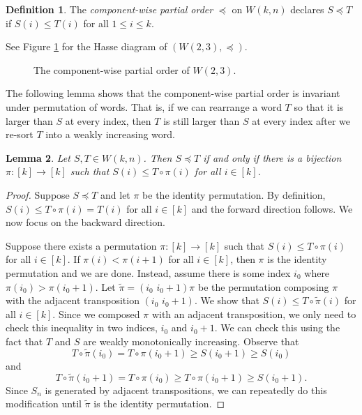 \documentclass{amsart}
\theoremstyle{definition}
\newtheorem{defn}{Definition}[section]
\theoremstyle{plain}
\newtheorem{lemma}[defn]{Lemma}
\begin{document}
\begin{defn}\label{defn:cmpt}
  The \emph{component-wise partial order} $\preceq$ on $W(k,n)$ declares $S\preceq T$ if $S(i)\leq T(i)$ for all $1\leq i \leq k$.
\end{defn}
\noindent See Figure \ref{fig:hasse_words} for the Hasse diagram of $(W(2,3), \preceq)$.


\begin{figure}[ht]
\caption{The component-wise partial order of $W(2,3)$.}
\label{fig:hasse_words}
\end{figure}

The following lemma shows that the component-wise partial order is invariant under permutation of words. That is, if we can rearrange a word $T$ so that it is larger than $S$ at every index, then $T$ is still larger than $S$ at every index after we re-sort $T$ into a weakly increasing word.

\begin{lemma}
  \label{lem:weaker_prec}
Let $S,T\in W(k,n)$. Then $S\preceq T$ if and only if there is a bijection $\pi:[k]\to [k]$ such that $S(i)\leq T\circ \pi (i)$ for all $i\in[k]$.
\end{lemma}
\begin{proof}
  Suppose $S\preceq T$ and let $\pi$ be the identity permutation. By definition, $S(i)\leq T\circ \pi(i)= T(i)$ for all $i\in[k]$ and the forward direction follows. We now focus on the backward direction.

  Suppose there exists a permutation $\pi:[k]\to [k]$ such that $S(i)\leq T\circ \pi(i)$ for all $i\in[k]$. If $\pi(i)< \pi(i+1)$ for all $i\in [k]$, then $\pi$ is the identity permutation and we are done. Instead, assume there is some index $i_0$ where $\pi(i_0)> \pi(i_0+1)$. Let $\tilde \pi= (i_0\,\, i_0+1)\pi$ be the permutation composing $\pi$ with the adjacent transposition $(i_0\,\, i_0+1)$. We show that $S(i) \leq T \circ \tilde \pi(i)$ for all $i\in[k]$. Since we composed $\pi$ with an adjacent transposition, we only need to check this inequality in two indices, $i_0$ and $i_0+1$. We can check this using the fact that $T$ and $S$ are weakly monotonically increasing. Observe that
  \[T\circ \tilde \pi(i_0) = T\circ\pi(i_0+1)\ge S(i_0+1) \ge S(i_0)   \]
  and
  \[T\circ \tilde \pi(i_{0}+1) = T\circ\pi(i_0) \geq T\circ \pi(i_0+1) \geq S(i_0+1). \]
 Since $S_n$ is generated by adjacent transpositions, we can repeatedly do this modification until $\tilde \pi$ is the identity permutation.
\end{proof}
\end{document}
